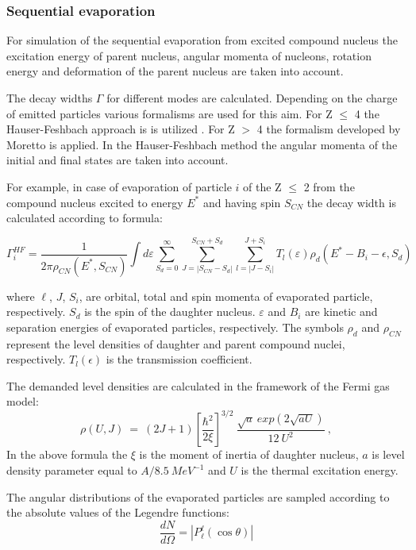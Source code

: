 \subsubsection{Sequential evaporation}

For simulation of the sequential evaporation from excited compound nucleus the excitation energy of parent nucleus, angular momenta of nucleons, rotation energy and deformation of the parent nucleus are taken into account.

The decay widths $\Gamma$ for different modes are calculated. Depending on the charge of emitted particles various formalisms are used for this aim. For Z $\leq$ 4 
the Hauser-Feshbach approach is  
is utilized \cite{Hauser-Feshbach}.
For Z $>$ 4 the formalism developed by Moretto \cite{Moretto1975211} is applied.
In the Hauser-Feshbach method the angular momenta of the initial and final states are taken into account.

For example, in case of evaporation of particle $i$ of the Z $\leq$ 2 from the compound nucleus excited to energy $E^*$ and having spin  $S_{CN}$ the decay width is calculated according to formula:

\begin{equation}
	\Gamma_i^{HF}=\frac{1}{2\pi\rho_{CN}\left(E^*,S_{CN}\right)}\int d\varepsilon\sum_{S_d=0}^{\infty}\sum_{J=\left|S_{CN}-S_d\right|}^{S_{CN}+S_d}\sum_{l=\left|J-S_i\right|}^{J+S_i}T_l(\varepsilon)\rho_{d}\left(E^*-B_i-\epsilon,S_d\right)
\end{equation}

where $\ell$, $J$, $S_i$, are orbital, total and spin momenta of evaporated particle, respectively.
$S_d$ is the spin of the daughter nucleus.  $\varepsilon$ and $B_i$ are kinetic and separation energies of evaporated particles, respectively. The symbols $\rho_d$ and $\rho_{CN}$ represent the level densities of daughter and parent compound nuclei, respectively.  $T_l(\epsilon)$ is the transmission coefficient. 

The demanded level densities are calculated in the framework of the Fermi gas model:
\begin{equation}
\rho(U,J) \ = \ (2J +1) \left [ \frac{\hbar^{2}}{2\xi} \right ]^{3/2} \ 
\frac{\sqrt{a} \ exp{(2 \sqrt{aU})}}{12 \ U^{2}} \ ,
\end{equation}
In the above formula the $\xi$ is the moment of inertia  of daughter nucleus, $a$ is level density parameter equal to $A/8.5 \ MeV^{-1}$ and $U$ is the thermal excitation energy. 

The angular distributions of the evaporated particles are sampled according to the 
absolute values of the Legendre functions:
\begin{equation}
	\frac{dN}{d\Omega}=\left|P_\ell^\ell\left(\cos\theta\right)\right|
\end{equation}

